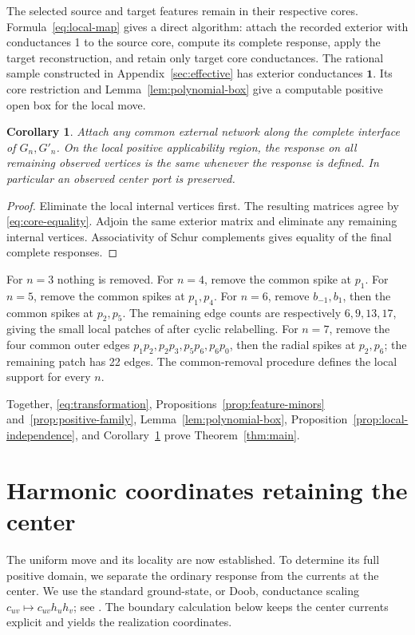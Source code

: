 \documentclass[11pt]{article}
\newtheorem{corollary}[theorem]{Corollary}
\theoremstyle{definition}
\newcommand{\one}{\mathbf 1}
\begin{document}
The selected source and target features remain in their respective cores.
Formula~\eqref{eq:local-map} gives a direct algorithm: attach the recorded
exterior with conductances 1 to the source core, compute its complete
response, apply the target reconstruction, and retain only target core
conductances.
The rational sample constructed in Appendix~\ref{sec:effective} has
exterior conductances \(\one\). Its core restriction and
Lemma~\ref{lem:polynomial-box} give a computable positive open box
for the local move.

\begin{corollary}
\label{cor:attachment}
Attach any common external network along the complete interface of
\(G_n,G'_n\). On the local positive applicability region, the response
on all remaining observed vertices is the same whenever the response
is defined. In particular an observed center port is preserved.
\end{corollary}
\begin{proof}
Eliminate the local internal vertices first.
The resulting matrices agree by \eqref{eq:core-equality}.
Adjoin the same exterior matrix and eliminate any remaining internal
vertices. Associativity of Schur complements gives equality of the
final complete responses.
\end{proof}

For \(n=3\) nothing is removed. For \(n=4\), remove the common
spike at \(p_1\). For \(n=5\), remove the common spikes at \(p_1,p_4\).
For \(n=6\), remove \(b_{-1},b_1\), then the common spikes at \(p_2,p_5\).
The remaining edge counts are respectively \(6,9,13,17\), giving the
small local patches of \cite{ABCC} after cyclic relabelling.
For \(n=7\), remove the four common outer edges
\(p_1p_2,p_2p_3,p_5p_6,p_6p_0\), then the radial spikes at
\(p_2,p_6\); the remaining
patch has 22 edges.
The common-removal procedure defines the local support for every \(n\).

Together, \eqref{eq:transformation},
Propositions~\ref{prop:feature-minors} and~\ref{prop:positive-family},
Lemma~\ref{lem:polynomial-box},
Proposition~\ref{prop:local-independence}, and
Corollary~\ref{cor:attachment} prove Theorem~\ref{thm:main}.

\section{Harmonic coordinates retaining the center}
\label{sec:harmonic}

The uniform move and its locality are now established. To determine
its full positive domain, we separate the ordinary response from the
currents at the center. We use the standard ground-state, or Doob,
conductance scaling
$c_{uv}\mapsto c_{uv}h_uh_v$; see
\cite[Proposition 2.1]{ACEM}. The boundary calculation below keeps
the center currents explicit and yields the realization coordinates.
\end{document}
